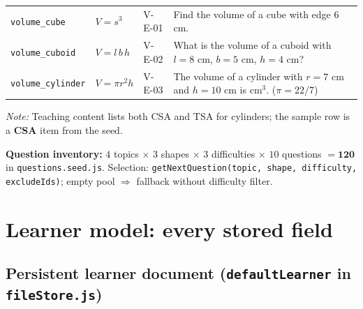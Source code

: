 \documentclass[12pt,a4paper]{article}
\begin{document}
\begin{longtable}{@{}p{2.6cm} p{3.8cm} p{1cm} >{\RaggedRight\arraybackslash}p{6.8cm}@{}}
\texttt{volume\_cube} &
$V = s^3$ & V-E-01 &
Find the volume of a cube with edge 6 cm. \\

\texttt{volume\_cuboid} &
$V = l\,b\,h$ & V-E-02 &
What is the volume of a cuboid with $l=8$ cm, $b=5$ cm, $h=4$ cm? \\ \rowcolor{rowhighlight}

\texttt{volume\_cylinder} &
$V = \pi r^2 h$ & V-E-03 &
The volume of a cylinder with $r=7$ cm and $h=10$ cm is \underline{\hspace{1.2cm}} cm$^3$. ($\pi=22/7$) \\

\end{longtable}

\noindent\textit{Note:} Teaching content lists both CSA and TSA for cylinders; the sample row is a \textbf{CSA} item from the seed.
\begin{notebox}
\textbf{Question inventory:} $4$ topics $\times$ $3$ shapes $\times$ $3$ difficulties $\times$ $10$
questions $= \mathbf{120}$ in \texttt{questions.seed.js}. Selection:
\texttt{getNextQuestion(topic, shape, difficulty, excludeIds)}; empty pool $\Rightarrow$ fallback without difficulty filter.
\end{notebox}

\section{Learner model: every stored field}

\subsection{Persistent learner document (\texttt{defaultLearner} in \texttt{fileStore.js})}
\end{document}
